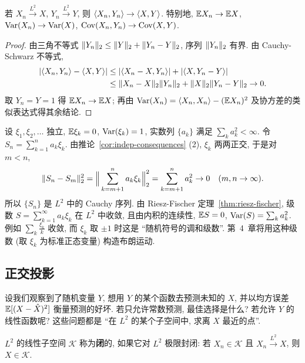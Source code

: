 \begin{proposition}[内积的连续性]\label{prop:inner-continuity}
若 $X_n\xrightarrow{L^2}X$, $Y_n\xrightarrow{L^2}Y$, 则 $\langle X_n,Y_n\rangle\to\langle X,Y\rangle$. 特别地, $\mathbb{E} X_n\to\mathbb{E} X$, $\operatorname{Var}(X_n)\to\operatorname{Var}(X)$, $\operatorname{Cov}(X_n,Y_n)\to\operatorname{Cov}(X,Y)$.
\end{proposition}

\begin{proof}
由三角不等式 $\lVert Y_n\rVert_2\le\lVert Y\rVert_2+\lVert Y_n-Y\rVert_2$, 序列 $\lVert Y_n\rVert_2$ 有界. 由 Cauchy-Schwarz 不等式,
\begin{align*}
\lvert\langle X_n,Y_n\rangle-\langle X,Y\rangle\rvert&\le\lvert\langle X_n-X,Y_n\rangle\rvert+\lvert\langle X,Y_n-Y\rangle\rvert\\
&\le\lVert X_n-X\rVert_2\lVert Y_n\rVert_2+\lVert X\rVert_2\lVert Y_n-Y\rVert_2\to0.
\end{align*}
取 $Y_n=Y=1$ 得 $\mathbb{E} X_n\to\mathbb{E} X$; 再由 $\operatorname{Var}(X_n)=\langle X_n,X_n\rangle-(\mathbb{E} X_n)^2$ 及协方差的类似表达式得其余结论.
\end{proof}

\begin{example}[独立随机变量级数]\label{ex:L2-series}
设 $\xi_1,\xi_2,\dots$ 独立, $\mathbb{E}\xi_k=0$, $\operatorname{Var}(\xi_k)=1$, 实数列 $\{a_k\}$ 满足 $\sum_ka_k^2<\infty$. 令 $S_n=\sum_{k=1}^na_k\xi_k$. 由推论~\ref{cor:indep-consequences} (2), $\xi_k$ 两两正交, 于是对 $m<n$,
\[
\lVert S_n-S_m\rVert_2^2=\Big\|\sum_{k=m+1}^na_k\xi_k\Big\|_2^2=\sum_{k=m+1}^na_k^2\to0\quad(m,n\to\infty).
\]
所以 $\{S_n\}$ 是 $L^2$ 中的 Cauchy 序列. 由 Riesz-Fischer 定理~\ref{thm:riesz-fischer}, 级数 $S=\sum_{k=1}^\infty a_k\xi_k$ 在 $L^2$ 中收敛, 且由内积的连续性, $\mathbb{E} S=0$, $\operatorname{Var}(S)=\sum_ka_k^2$. 例如 $\sum_k\frac{\xi_k}{k}$ 收敛, 而 $\xi_k$ 取 $\pm1$ 时这是 ``随机符号的调和级数''. 第~4~章将用这种级数 (取 $\xi_k$ 为标准正态变量) 构造布朗运动.
\end{example}

\subsection{正交投影}

设我们观察到了随机变量 $Y$, 想用 $Y$ 的某个函数去预测未知的 $X$, 并以均方误差 $\mathbb{E}[(X-\hat X)^2]$ 衡量预测的好坏. 若只允许常数预测, 最佳选择是什么? 若允许 $Y$ 的线性函数呢? 这些问题都是 ``在 $L^2$ 的某个子空间中, 求离 $X$ 最近的点''.

\begin{definition}[闭子空间]
$L^2$ 的线性子空间 $\mathcal{K}$ 称为\textbf{闭}的, 如果它对 $L^2$ 极限封闭: 若 $X_n\in\mathcal{K}$ 且 $X_n\xrightarrow{L^2}X$, 则 $X\in\mathcal{K}$.
\end{definition}

